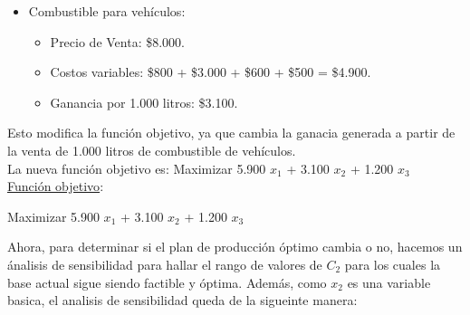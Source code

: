 \documentclass[10pt,a4paper]{article}
\begin{document}
\begin{enumerate}[label=\textbf{\sffamily\large\arabic*.}]
    \begin{itemize}

        \item Combustible para vehículos:
        \begin{itemize}

            \item Precio de Venta: \$8.000.
            \item Costos variables: \$800 + \$3.000 + \$600 + \$500 = \$4.900.
            \item Ganancia por 1.000 litros: \$3.100. \\
    
        \end{itemize}
    \end{itemize}
    
    Esto modifica la función objetivo, ya que cambia la ganacia generada a partir de la venta de 1.000 litros de combustible de vehículos. \\ 
    La nueva función objetivo es: Maximizar 5.900 $x_{1}$ + 3.100 $x_{2}$ + 1.200 $x_{3}$ \\


    \underline{Función objetivo}: 

    \begin{center}
        
        Maximizar 5.900 $x_{1}$ + 3.100 $x_{2}$ + 1.200 $x_{3}$

    \end{center}

    \clearpage


    Ahora, para determinar si el plan de producción óptimo cambia o no, hacemos un ánalisis de sensibilidad para hallar el rango
    de valores de $C_{2}$ para los cuales la base actual sigue siendo factible y óptima. Además, como $x_{2}$ es una variable basica,
    el analisis de sensibilidad queda de la sigueinte manera: \\


\end{enumerate}
\end{document}
